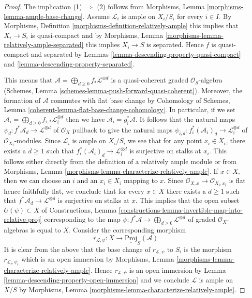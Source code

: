 \begin{proof}
The implication (1) $\Rightarrow$ (2) follows from
Morphisms, Lemma \ref{morphisms-lemma-ample-base-change}.
Assume $\mathcal{L}_i$ is ample on $X_i/S_i$ for every $i \in I$.
By Morphisms, Definition \ref{morphisms-definition-relatively-ample}
this implies that $X_i \to S_i$ is quasi-compact and by
Morphisms, Lemma \ref{morphisms-lemma-relatively-ample-separated}
this implies $X_i \to S$ is separated.
Hence $f$ is quasi-compact and separated by
Lemmas \ref{lemma-descending-property-quasi-compact} and
\ref{lemma-descending-property-separated}.

\medskip\noindent
This means that
$\mathcal{A} = \bigoplus_{d \geq 0} f_*\mathcal{L}^{\otimes d}$
is a quasi-coherent graded $\mathcal{O}_S$-algebra
(Schemes, Lemma \ref{schemes-lemma-push-forward-quasi-coherent}).
Moreover, the formation of $\mathcal{A}$ commutes with flat
base change by
Cohomology of Schemes, Lemma \ref{coherent-lemma-flat-base-change-cohomology}.
In particular, if we set
$\mathcal{A}_i = \bigoplus_{d \geq 0} f_{i, *}\mathcal{L}_i^{\otimes d}$
then we have $\mathcal{A}_i = g_i^*\mathcal{A}$.
It follows that the natural maps
$\psi_d : f^*\mathcal{A}_d \to \mathcal{L}^{\otimes d}$
of $\mathcal{O}_X$
pullback to give the natural maps
$\psi_{i, d} : f_i^*(\mathcal{A}_i)_d \to \mathcal{L}_i^{\otimes d}$
of $\mathcal{O}_{X_i}$-modules. Since $\mathcal{L}_i$ is ample on $X_i/S_i$
we see that for any point $x_i \in X_i$, there exists a $d \geq 1$
such that $f_i^*(\mathcal{A}_i)_d \to \mathcal{L}_i^{\otimes d}$
is surjective on stalks at $x_i$. This follows either directly
from the definition of a relatively ample module or from
Morphisms, Lemma \ref{morphisms-lemma-characterize-relatively-ample}.
If $x \in X$, then we can choose an $i$ and an $x_i \in X_i$
mapping to $x$. Since $\mathcal{O}_{X, x} \to \mathcal{O}_{X_i, x_i}$
is flat hence faithfully flat, we conclude that for every $x \in X$
there exists a $d \geq 1$ such that
$f^*\mathcal{A}_d \to \mathcal{L}^{\otimes d}$
is surjective on stalks at $x$.
This implies that the open subset $U(\psi) \subset X$ of
Constructions, Lemma
\ref{constructions-lemma-invertible-map-into-relative-proj}
corresponding to the map
$\psi : f^*\mathcal{A} \to \bigoplus_{d \geq 0} \mathcal{L}^{\otimes d}$
of graded $\mathcal{O}_X$-algebras
is equal to $X$. Consider the corresponding morphism
$$
r_{\mathcal{L}, \psi} : X \longrightarrow \underline{\text{Proj}}_S(\mathcal{A})
$$
It is clear from the above that the base change of
$r_{\mathcal{L}, \psi}$ to $S_i$ is the morphism
$r_{\mathcal{L}_i, \psi_i}$ which is an open immersion by
Morphisms, Lemma \ref{morphisms-lemma-characterize-relatively-ample}.
Hence $r_{\mathcal{L}, \psi}$ is an open immersion
by Lemma \ref{lemma-descending-property-open-immersion}
and we conclude $\mathcal{L}$ is ample on $X/S$ by
Morphisms, Lemma \ref{morphisms-lemma-characterize-relatively-ample}.
\end{proof}















